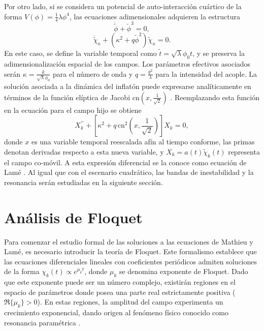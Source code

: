 Por otro lado, si se considera un potencial de auto-interacción cuártico de la forma $\displaystyle V(\phi) = \frac{1}{4} \lambda \phi^4$, las ecuaciones adimensionales adquieren la estructura
\begin{equation}
    \ddot{\tilde{\phi}} + \tilde{\phi}^3 = 0,
\end{equation}
\begin{equation}
    \ddot{\tilde{\chi}}_{\kappa} + \left( \kappa^2 + q \tilde{\phi}^2 \right) \tilde{\chi}_\kappa = 0.
\end{equation}
En este caso, se define la variable temporal como $\tilde{t} = \sqrt{\lambda} \phi_0 t$, y se preserva la adimensionalización espacial de los campos. Los parámetros efectivos asociados serán $\displaystyle \kappa = \frac{k}{\sqrt{\lambda} \phi_0}$ para el número de onda y $\displaystyle q = \frac{g^2}{\lambda}$ para la intensidad del acople. La solución asociada a la dinámica del inflatón puede expresarse analíticamente en términos de la función elíptica de Jacobi $\displaystyle \mathrm{cn} \left(x, \frac{1}{\sqrt{2}} \right)$ \cite{Greene_1997}. Reemplazando esta función en la ecuación para el campo hijo se obtiene
\begin{equation}
    X_k^{\prime \prime} + \left[ \kappa^2 + q \, \mathrm{cn}^2 \left(x, \frac{1}{\sqrt{2}} \right) \right] X_k = 0,
\end{equation}
donde $x$ es una variable temporal reescalada afín al tiempo conforme, las primas denotan derivadas respecto a esta nueva variable, y $X_k = a(t) \tilde{\chi}_k(t)$ representa el campo co-móvil. A esta expresión diferencial se la conoce como ecuación de Lamé \cite{Greene_1997}. Al igual que con el escenario cuadrático, las bandas de inestabilidad y la resonancia serán estudiadas en la siguiente sección.

\section{Análisis de Floquet}\label{sec:Floquet}

Para comenzar el estudio formal de las soluciones a las ecuaciones de Mathieu y Lamé, es necesario introducir la teoría de Floquet. Este formalismo establece que las ecuaciones diferenciales lineales con coeficientes periódicos admiten soluciones de la forma $\chi_k(t) \propto e^{\mu_k t}$, donde $\mu_k$ se denomina exponente de Floquet. Dado que este exponente puede ser un número complejo, existirán regiones en el espacio de parámetros donde posea una parte real estrictamente positiva ($\Re\{\mu_k\} > 0$). En estas regiones, la amplitud del campo experimenta un crecimiento exponencial, dando origen al fenómeno físico conocido como resonancia paramétrica \cite{Kofman_1994, Kofman_1997}. 

